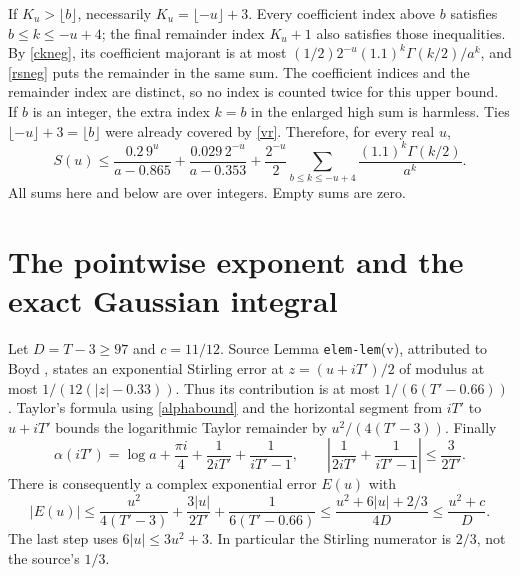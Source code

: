 \documentclass[11pt]{article}
\begin{document}
If $K_u>\lfloor b\rfloor$, necessarily $K_u=\lfloor-u\rfloor+3$.
Every coefficient index above $b$ satisfies $b\le k\le-u+4$;
the final remainder index $K_u+1$ also satisfies those inequalities.
By \eqref{ckneg}, its coefficient majorant is at most
$(1/2)2^{-u}(1.1)^k\Gamma(k/2)/a^k$, and \eqref{rsneg}
puts the remainder in the same sum. The coefficient indices and
the remainder index are distinct, so no index is counted twice
for this upper bound. If $b$ is an integer, the extra index $k=b$
in the enlarged high sum is harmless. Ties
$\lfloor-u\rfloor+3=\lfloor b\rfloor$ were already covered by
\eqref{vr}. Therefore, for every real $u$,
\begin{equation}\label{Sbound}
 S(u)\le\frac{0.2\,9^u}{a-0.865}
       +\frac{0.029\,2^{-u}}{a-0.353}
       +\frac{2^{-u}}2\sum_{b\le k\le-u+4}
                              \frac{(1.1)^k\Gamma(k/2)}{a^k}.
\end{equation}
All sums here and below are over integers. Empty sums are zero.

\section{The pointwise exponent and the exact Gaussian integral}

Let $D=T-3\ge97$ and $c=11/12$. Source Lemma
\texttt{elem-lem}(v), attributed to Boyd \cite{polymath,boyd},
states an exponential Stirling error at $z=(u+iT')/2$ of modulus
at most $1/(12(|z|-0.33))$. Thus its contribution is at most
$1/(6(T'-0.66))$. Taylor's formula using \eqref{alphabound}
and the horizontal segment from $iT'$ to $u+iT'$ bounds the
logarithmic Taylor remainder by $u^2/(4(T'-3))$. Finally
\[
 \alpha(iT')=\log a+\frac{\pi i}4+\frac1{2iT'}+\frac1{iT'-1},
 \qquad
 \left|\frac1{2iT'}+\frac1{iT'-1}\right|\le\frac3{2T'}.
\]
There is consequently a complex exponential error $E(u)$ with
\begin{equation}\label{Ebound}
 |E(u)|\le\frac{u^2}{4(T'-3)}+\frac{3|u|}{2T'}
                      +\frac1{6(T'-0.66)}
 \le\frac{u^2+6|u|+2/3}{4D}
 \le\frac{u^2+c}{D}.
\end{equation}
The last step uses $6|u|\le3u^2+3$. In particular the Stirling
numerator is $2/3$, not the source's $1/3$.
\end{document}
